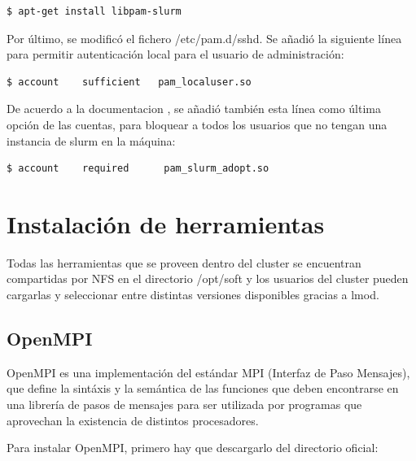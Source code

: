 \vspace{2mm}
\begin{lstlisting}[language=bash]
    $ apt-get install libpam-slurm
\end{lstlisting}
\vspace{2mm}

Por último, se modificó el fichero /etc/pam.d/sshd. Se añadió la siguiente línea para permitir autenticación local para el usuario de administración: 

\vspace{2mm}
\begin{lstlisting}[language=bash]
    $ account    sufficient   pam_localuser.so
\end{lstlisting}
\vspace{2mm}

De acuerdo a la documentacion \cite{slurmpam}, se añadió también esta línea como última opción de las cuentas, para bloquear a todos los usuarios que no tengan una instancia de slurm en la máquina:
 
\vspace{2mm}
\begin{lstlisting}[language=bash]
    $ account    required      pam_slurm_adopt.so
\end{lstlisting}
\vspace{2mm}



\section{Instalación de herramientas}

Todas las herramientas que se proveen dentro del cluster se encuentran compartidas por NFS en el directorio /opt/soft y los usuarios del cluster pueden cargarlas y seleccionar entre distintas versiones disponibles gracias a lmod.

\subsection{OpenMPI}

OpenMPI es una implementación del estándar MPI \cite{mpi} (Interfaz de Paso Mensajes), que define la sintáxis y la semántica de las funciones que deben encontrarse en una librería de pasos de mensajes para ser utilizada por programas que aprovechan la existencia de distintos procesadores.
\vspace{2mm}

Para instalar OpenMPI, primero hay que descargarlo del directorio oficial:

